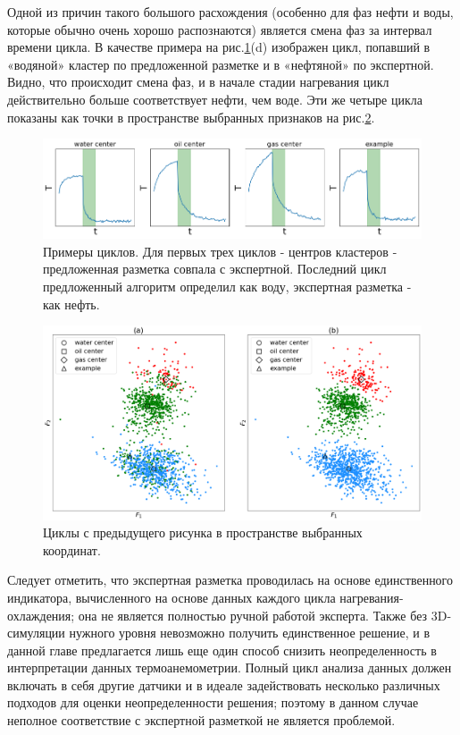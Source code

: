 Одной из причин такого большого расхождения (особенно для фаз нефти и воды, которые обычно очень хорошо распознаются) является смена фаз за интервал времени цикла. В качестве примера на рис.\ref{fig:error_analysis}(d) изображен цикл, попавший в «водяной» кластер по предложенной разметке и в «нефтяной» по экспертной. Видно, что происходит смена фаз, и в начале стадии нагревания цикл действительно больше соответствует нефти, чем воде. Эти же четыре цикла показаны как точки в пространстве выбранных признаков на рис.\ref{fig:error_analysis_coordinates}.

\begin{figure}[H]
\centering
\includegraphics[width=1.0\textwidth]{TA/error_analysis.png}
\caption{Примеры циклов. Для первых трех циклов - центров кластеров - предложенная разметка совпала с экспертной. Последний цикл предложенный алгоритм определил как воду, экспертная разметка - как нефть.}
\label{fig:error_analysis}
\end{figure}

\begin{figure}[H]
\centering
\includegraphics[width=1.0\textwidth]{TA/error_analysis_coordinates.png}
\caption{Циклы с предыдущего рисунка в пространстве выбранных координат.}
\label{fig:error_analysis_coordinates}
\end{figure}

\par
Следует отметить, что экспертная разметка проводилась на основе единственного индикатора, вычисленного на основе данных каждого цикла нагревания-охлаждения; она не является полностью ручной работой эксперта. Также без 3D-симуляции нужного уровня невозможно получить единственное решение, и в данной главе предлагается лишь еще один способ снизить неопределенность в интерпретации данных термоанемометрии. Полный цикл анализа данных должен включать в себя другие датчики и в идеале задействовать несколько различных подходов для оценки неопределенности решения; поэтому в данном случае неполное соответствие с экспертной разметкой не является проблемой.
